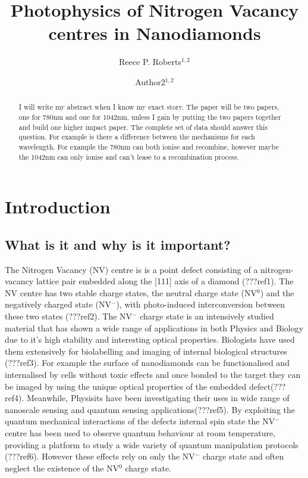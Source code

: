 \documentclass[preprint,prl]{revtex4}
\begin{document}
\title{Photophysics of Nitrogen Vacancy centres in Nanodiamonds}
  
\author{Reece P. Roberts$^{1,2}$}
\author{Author2$^{1,2}$}



\begin{abstract}
I will write my abstract when I know my exact story.
The paper will be two papers, one for 780nm and one for 1042nm, unless I gain by putting the two papers together and build one higher impact paper.
The complete set of data should answer this question.
For example is there a difference between the mechanisms for each wavelength. For example the 780nm can both ionise and recombine, however maybe the 1042nm can only ionise and can't lease to a recombination process.
\end{abstract}

\maketitle

\section{Introduction}
\subsection{What is it and why is it important?}
The Nitrogen Vacancy (NV) centre is is a point defect consisting of a nitrogen-vacancy lattice pair embedded along the [111] axis of a diamond (???ref1). The NV centre has two stable charge states, the neutral charge state (NV$^0$) and the negatively charged state (NV$^-$), with photo-induced interconversion between these two states (???ref2). The NV$^-$ charge state is an intensively studied material that has shown a wide range of applications in both Physics and Biology due to it's high stability and interesting optical properties. Biologists have used them extensively for biolabelling and imaging of internal biological structures (???ref3). For example the surface of nanodiamonds can be functionalised and internalised by cells without toxic effects and once bonded to the target they can be imaged by using the unique optical properties of the embedded defect(???ref4). Meanwhile, Physisits have been investigating their uses in wide range of nanoscale sensing and quantum sensing applications(???ref5). By exploiting the quantum mechanical interactions of the defects internal spin state the NV$^-$ centre has been used to observe quantum behaviour at room temperature, providing a platform to study a wide variety of quantum manipulation protocols (???ref6). However these effects rely on only the NV$^-$ charge state and often neglect the  existence of the NV$^0$ charge state. 
\end{document}
